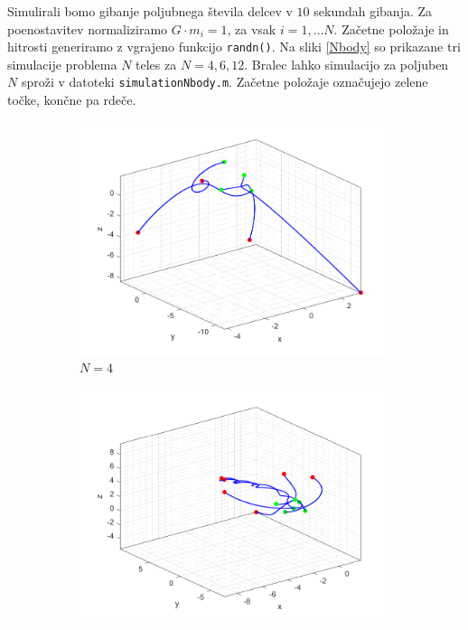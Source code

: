 \documentclass[a4paper,12pt]{article}
\begin{document}
Simulirali bomo gibanje poljubnega števila delcev v $10$ sekundah gibanja.
Za poenostavitev normaliziramo $G \cdot m_i=1$, za vsak $i=1,\dots N$.
Začetne položaje in hitrosti generiramo z vgrajeno funkcijo \texttt{randn()}.
Na sliki \ref{Nbody} so prikazane tri simulacije problema $N$ teles za $N=4, 6, 12$.
Bralec lahko simulacijo za poljuben $N$ sproži v datoteki \texttt{simulation\textunderscore Nbody.m}.
Začetne položaje označujejo zelene točke, končne pa rdeče.
\begin{figure}[H]
    \centering
    \begin{subfigure}[b]{0.6\textwidth}
        \centering
        \includegraphics[width=\textwidth]{figures/4body.png}
        \caption{$N=4$}
        \label{fig:y equals x}
    \end{subfigure}
    \hfill
    \begin{subfigure}[b]{0.6\textwidth}
        \centering
        \includegraphics[width=\textwidth]{figures/6body.png}

\end{subfigure}
\end{figure}
\end{document}
